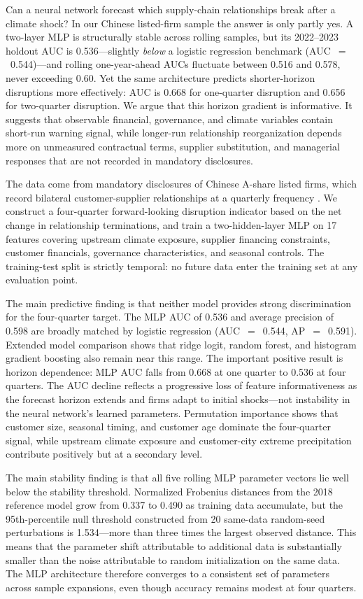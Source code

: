 \documentclass[12pt]{article}
\begin{document}
Can a neural network forecast which supply-chain relationships break after
a climate shock?  In our Chinese listed-firm sample the answer is only
partly yes.  A two-layer MLP is structurally stable across rolling samples,
but its 2022--2023 holdout AUC is 0.536---slightly \emph{below} a logistic
regression benchmark (AUC~$=$~0.544)---and rolling one-year-ahead AUCs
fluctuate between 0.516 and 0.578, never exceeding 0.60.  Yet the same
architecture predicts shorter-horizon disruptions more effectively: AUC is
0.668 for one-quarter disruption and 0.656 for two-quarter disruption.  We
argue that this horizon gradient is informative.  It suggests that observable
financial, governance, and climate variables contain short-run warning signal,
while longer-run relationship reorganization depends more on unmeasured
contractual terms, supplier substitution, and managerial responses that are
not recorded in mandatory disclosures.

The data come from mandatory disclosures of Chinese A-share listed firms,
which record bilateral customer-supplier relationships at a quarterly
frequency \citep{original2024climate}.  We construct a four-quarter
forward-looking disruption indicator based on the net change in relationship
terminations, and train a two-hidden-layer MLP on 17 features covering
upstream climate exposure, supplier financing constraints, customer
financials, governance characteristics, and seasonal controls.  The
training-test split is strictly temporal: no future data enter the training
set at any evaluation point.

The main predictive finding is that neither model provides strong
discrimination for the four-quarter target.  The MLP AUC of 0.536 and average
precision of 0.598 are broadly matched by logistic regression
(AUC~$=$~0.544, AP~$=$~0.591).  Extended model comparison shows that ridge
logit, random forest, and histogram gradient boosting also remain near this
range.  The important positive result is horizon dependence: MLP AUC falls
from 0.668 at one quarter to 0.536 at four quarters.  The AUC decline
reflects a progressive loss of feature informativeness as the forecast horizon
extends and firms adapt to initial shocks---not instability in the neural
network's learned parameters.  Permutation importance shows that customer
size, seasonal timing, and customer age dominate the four-quarter signal,
while upstream climate exposure and customer-city extreme precipitation
contribute positively but at a secondary level.

The main stability finding is that all five rolling MLP parameter vectors
lie well below the stability threshold.  Normalized Frobenius distances
from the 2018 reference model grow from 0.337 to 0.490 as training data
accumulate, but the 95th-percentile null threshold constructed from 20
same-data random-seed perturbations is 1.534---more than three times the
largest observed distance.  This means that the parameter shift attributable
to additional data is substantially smaller than the noise attributable to
random initialization on the same data.  The MLP architecture therefore
converges to a consistent set of parameters across sample expansions, even
though accuracy remains modest at four quarters.
\end{document}
